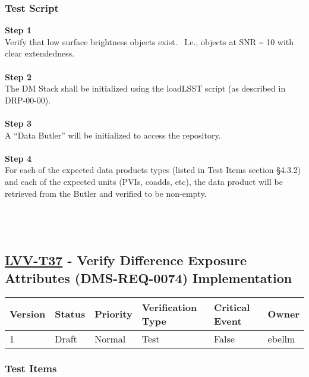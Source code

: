 \hypertarget{test-script-15}{%
\subsubsection{Test Script}\label{test-script-15}}

\textbf{Step 1}\\
Verify that low surface brightness objects exist. ~I.e., objects at SNR
\textasciitilde{} 10 with clear extendedness.\\
~\\
\textbf{Step 2}\\
The DM Stack shall be initialized using the loadLSST script (as
described in DRP-00-00).\\
~\\
\textbf{Step 3}\\
A ``Data Butler'' will be initialized to access the repository.\\
~\\
\textbf{Step 4}\\
For each of the expected data products types (listed in Test Items
section §4.3.2) and each of the expected units (PVIs, coadds, etc), the
data product will be retrieved from the Butler and verified to be
non-empty.\\
~\\
~\\
~\\

\hypertarget{lvv-t37---verify-difference-exposure-attributes-dms-req-0074-implementation}{%
\subsection{\texorpdfstring{\href{https://jira.lsstcorp.org/secure/Tests.jspa\#/testCase/LVV-T37}{LVV-T37}
- Verify Difference Exposure Attributes (DMS-REQ-0074)
Implementation}{LVV-T37 - Verify Difference Exposure Attributes (DMS-REQ-0074) Implementation}}\label{lvv-t37---verify-difference-exposure-attributes-dms-req-0074-implementation}}

\begin{longtable}[]{@{}llllll@{}}
\toprule
Version & Status & Priority & Verification Type & Critical Event &
Owner\tabularnewline
\midrule
\endhead
1 & Draft & Normal & Test & False & ebellm\tabularnewline
\bottomrule
\end{longtable}

\hypertarget{test-items-16}{%
\subsubsection{Test Items}\label{test-items-16}}

